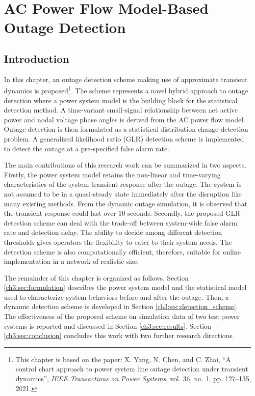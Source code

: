 
\chapter{AC Power Flow Model-Based Outage Detection}
\label{ch:detection_using_approximate_dynamics}
\vspace{2em}

\section{Introduction} %
\label{ch3:sec:introduction}

In this chapter, an outage detection scheme making use of approximate transient dynamics is proposed\footnote{This chapter is based on the paper: X. Yang, N. Chen, and C. Zhai, “A control chart approach to power system line outage detection under transient dynamics”, \textit{IEEE Transactions on Power Systems}, vol. 36, no. 1, pp. 127–135, 2021.}. The scheme represents a novel hybrid approach to outage detection where a power system model is the building block for the statistical detection method. A time-variant small-signal relationship between net active power and nodal voltage phase angles is derived from the AC power flow model. Outage detection is then formulated as a statistical distribution change detection problem. A generalized likelihood ratio (GLR) detection scheme is implemented to detect the outage at a pre-specified false alarm rate. 

The main contributions of this research work can be summarized in two aspects. Firstly, the power system model retains the non-linear and time-varying characteristics of the system transient response after the outage. The system is not assumed to be in a quasi-steady state immediately after the disruption like many existing methods. From the dynamic outage simulation, it is observed that the transient response could last over 10 seconds. Secondly, the proposed GLR detection scheme can deal with the trade-off between system-wide false alarm rate and detection delay. The ability to decide among different detection thresholds gives operators the flexibility to cater to their system needs. The detection scheme is also computationally efficient, therefore, suitable for online implementation in a network of realistic size.

The remainder of this chapter is organized as follows. Section \ref{ch3:sec:formulation} describes the power system model and the statistical model used to characterize system behaviors before and after the outage. Then, a dynamic detection scheme is developed in Section \ref{ch3:sec:detection_scheme}. The effectiveness of the proposed scheme on simulation data of two test power systems is reported and discussed in Section \ref{ch3:sec:results}. Section \ref{ch3:sec:conclusion} concludes this work with two further research directions.


